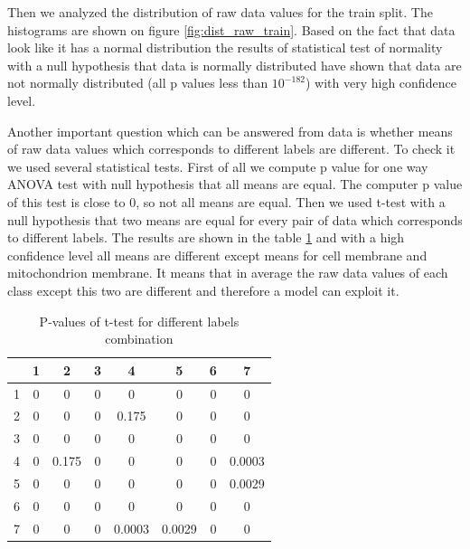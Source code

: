 \documentclass[twocolumn, a4paper]{article}
\theoremstyle{definition}
\begin{document}
Then we analyzed the distribution of raw data values for the train split. The histograms
are shown on figure \ref{fig:dist_raw_train}. Based on the fact that data look like it has
a normal distribution the results of statistical test of normality \cite{normalitytest} with a
null hypothesis that data is normally distributed have shown that data are not normally distributed
(all p values less than \( 10^{-182} \)) with very high confidence level.

Another important question which can be answered from data is whether means of raw data values
which corresponds to different labels are different. To check it we used several statistical tests.
First of all we compute p value for one way ANOVA \cite{lowry2014concepts} test with null hypothesis that all means are equal.
The computer p value of this test is close to 0, so not all means are equal. Then we used t-test \cite{student1908probable}
with a null hypothesis that two means are equal for every pair of data which corresponds to different labels.
The results are shown in the table \ref{tab:data_ttest} and with a high confidence level
all means are different except means for cell membrane and mitochondrion membrane. It means that in average the
raw data values of each class except this two are different and therefore a model can exploit it.

\begin{table}[ht]
    \centering
    \begin{tabular}{c|c|c|c|c|c|c|c}
          & 1 & 2     & 3 & 4      & 5      & 6 & 7      \\
        \hline
        1 & 0 & 0     & 0 & 0      & 0      & 0 & 0      \\
        \hline
        2 & 0 & 0     & 0 & 0.175  & 0      & 0 & 0      \\
        \hline
        3 & 0 & 0     & 0 & 0      & 0      & 0 & 0      \\
        \hline
        4 & 0 & 0.175 & 0 & 0      & 0      & 0 & 0.0003 \\
        \hline
        5 & 0 & 0     & 0 & 0      & 0      & 0 & 0.0029 \\
        \hline
        6 & 0 & 0     & 0 & 0      & 0      & 0 & 0      \\
        \hline
        7 & 0 & 0     & 0 & 0.0003 & 0.0029 & 0 & 0      \\
    \end{tabular}
    \caption{P-values of t-test for different labels combination}
    \label{tab:data_ttest}
\end{table}
\end{document}
